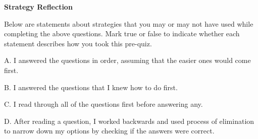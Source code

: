 \documentclass{ximera}
\begin{document}

\begin{center} \textbf{Strategy Reflection}\end{center}

\begin{question}

Below are statements about strategies that you may or may not have used while completing the above questions.  Mark true or false to indicate whether each statement describes how you took this pre-quiz. 

\begin{question}

    A. I answered the questions in order, assuming that the easier ones would come first.

    \begin{multipleChoice}
    \end{multipleChoice}
    
\end{question}
\begin{question}
    
    B. I answered the questions that I knew how to do first.

    \begin{multipleChoice}
    \end{multipleChoice}
    
\end{question}

\begin{question}
    
    C. I read through all of the questions first before answering any.

    \begin{multipleChoice}
    \end{multipleChoice}
    
\end{question}
\begin{question}
    
    D. After reading a question, I worked backwards and used process of elimination to narrow down my options by checking if the answers were correct.

    \begin{multipleChoice}
    \end{multipleChoice}
    

\end{question}
\end{question}
\end{document}
